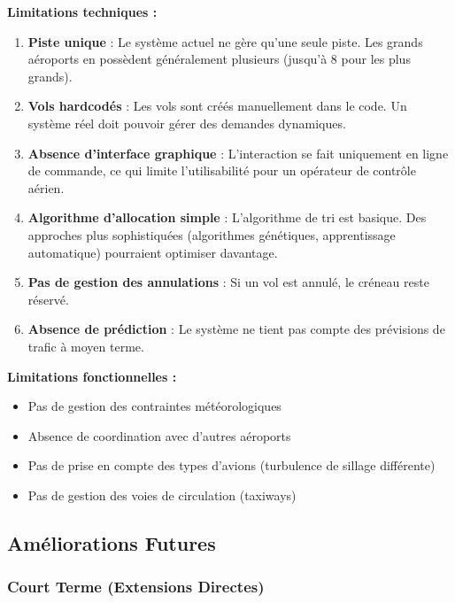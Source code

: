 \documentclass[12pt,a4paper]{article}
\begin{document}
\textbf{Limitations techniques :}

\begin{enumerate}[leftmargin=*]
    \item \textbf{Piste unique} : Le système actuel ne gère qu'une seule piste. Les grands aéroports en possèdent généralement plusieurs (jusqu'à 8 pour les plus grands).

    \item \textbf{Vols hardcodés} : Les vols sont créés manuellement dans le code. Un système réel doit pouvoir gérer des demandes dynamiques.

    \item \textbf{Absence d'interface graphique} : L'interaction se fait uniquement en ligne de commande, ce qui limite l'utilisabilité pour un opérateur de contrôle aérien.

    \item \textbf{Algorithme d'allocation simple} : L'algorithme de tri est basique. Des approches plus sophistiquées (algorithmes génétiques, apprentissage automatique) pourraient optimiser davantage.

    \item \textbf{Pas de gestion des annulations} : Si un vol est annulé, le créneau reste réservé.

    \item \textbf{Absence de prédiction} : Le système ne tient pas compte des prévisions de trafic à moyen terme.
\end{enumerate}

\textbf{Limitations fonctionnelles :}

\begin{itemize}[leftmargin=*]
    \item Pas de gestion des contraintes météorologiques
    \item Absence de coordination avec d'autres aéroports
    \item Pas de prise en compte des types d'avions (turbulence de sillage différente)
    \item Pas de gestion des voies de circulation (taxiways)
\end{itemize}

\subsection{Améliorations Futures}

\subsubsection{Court Terme (Extensions Directes)}
\end{document}
